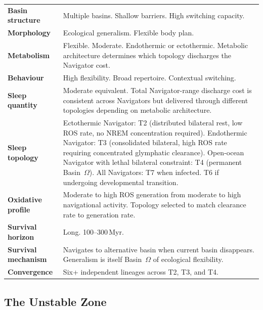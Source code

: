 \documentclass[10pt, a4paper]{article}
\begin{document}
\begin{mdframed}[
  backgroundcolor=navbox,
  linecolor=headergreen,
  linewidth=0.8pt,
  innertopmargin=0.5em,
  innerbottommargin=0.5em,
  innerleftmargin=0.8em,
  innerrightmargin=0.8em
]
\small
\begin{tabular}{p{3.0cm}p{9.5cm}}
\textbf{Basin structure} &
Multiple basins. Shallow barriers.
High switching capacity.\\[0.2em]
\textbf{Morphology} &
Ecological generalism. Flexible body
plan.\\[0.2em]
\textbf{Metabolism} &
Flexible. Moderate. Endothermic or
ectothermic. Metabolic architecture
determines which topology discharges
the Navigator cost.\\[0.2em]
\textbf{Behaviour} &
High flexibility. Broad repertoire.
Contextual switching.\\[0.2em]
\textbf{Sleep quantity} &
Moderate equivalent. Total Navigator-range
discharge cost is consistent across
Navigators but delivered through different
topologies depending on metabolic
architecture.\\[0.2em]
\textbf{Sleep topology} &
Ectothermic Navigator: T2 (distributed
bilateral rest, low ROS rate, no NREM
concentration required).
Endothermic Navigator: T3 (consolidated
bilateral, high ROS rate requiring
concentrated glymphatic clearance).
Open-ocean Navigator with lethal bilateral
constraint: T4 (permanent Basin~$\Omega$).
All Navigators: T7 when infected.
T6 if undergoing developmental transition.\\[0.2em]
\textbf{Oxidative profile} &
Moderate to high ROS generation from
moderate to high navigational activity.
Topology selected to match clearance
rate to generation rate.\\[0.2em]
\textbf{Survival horizon} &
Long. 100--300\,Myr.\\[0.2em]
\textbf{Survival mechanism} &
Navigates to alternative basin when
current basin disappears. Generalism
is itself Basin~$\Omega$ of ecological
flexibility.\\[0.2em]
\textbf{Convergence} &
Six+ independent lineages across T2,
T3, and T4.\\
\end{tabular}
\end{mdframed}

\subsection{The Unstable Zone}
\end{document}
